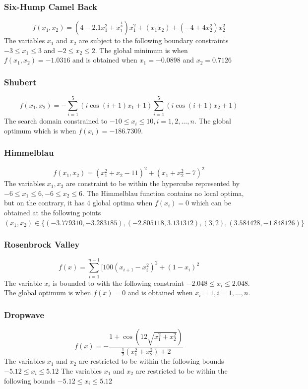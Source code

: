 \subsubsection{Six-Hump Camel Back}
\begin{equation}
	f(x_1,x_2) = (4 - 2.1x_1^2 + x_1^{\frac{4}{3}})x_1^2 + (x_1x_2) + (-4 + 4x_2^2)x_2^2
\end{equation}
The variables $x_1$ and $x_2$ are subject to the following boundary constraints $-3 \leq x_1 \leq 3$ and $-2 \leq x_2 \leq 2$. The global minimum is when $f(x_1,x_2) = -1.0316$ and is obtained when $x_1 = -0.0898$ and $x_2 = 0.7126$
\subsubsection{Shubert}
\begin{equation}
	f(x_1,x_2) = -\sum_{i = 1}^5 (i\cos{(i +1)x_1 + 1})\sum_{i=1}^5 (i\cos{(i+1)x_2 + 1})
\end{equation}
The search domain constrained to $-10 \leq x_i \leq 10, i = 1,2, \ldots, n$. The global optimum which is when $f(x_i) = -186.7309$.
\subsubsection{Himmelblau}
\begin{equation}
	f(x_1,x_2) = (x_1^2 + x_2 - 11)^2 + (x_1 + x_2^2 - 7)^2
\end{equation}
The variables $x_1,x_2$ are constraint to be within the hypercube represented by $-6 \leq x_1 \leq 6, -6 \leq x_2 \leq 6$. The Himmelblau function contains no local optima, but on the contrary, it has 4 global optima when $f(x_i) = 0$ which can be obtained at the following points $(x_1,x_2) \in \{(-3.779310,-3.283185),(-2.805118,3.131312),(3,2),(3.584428,-1.848126)\}$
\subsubsection{Rosenbrock Valley}
\begin{equation}
	f(x) = \sum_{i=1}^{n-1}[100(x_{i+1} - x_i^2)^2 + (1-x_i)^2
\end{equation}
The variable $x_i$ is bounded to with the following constraint $ -2.048 \leq x_i \leq 2.048 $. The global optimum is when $f(x) = 0$ and is obtained when $x_i = 1, i = 1,\ldots,n$.
\subsubsection{Dropwave}
\begin{equation}
	f(x) = -\frac{1 + \cos{(12\sqrt{x_1^2 + x_2^2})}}{\frac{1}{2}(x_1^2 + x_2^2) + 2}
\end{equation}
The variables $x_1$ and $x_2$ are restricted to be within the following bounds $-5.12 \leq x_i \leq 5.12$
The variables $x_1$ and $x_2$ are restricted to be within the following bounds $-5.12 \leq x_i \leq 5.12$

